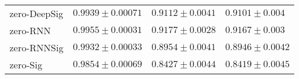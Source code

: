 \begin{tabular}{llll}
zero-DeepSig   &                           $ 0.9939 \pm 0.00071 $ &                           $ 0.9112 \pm 0.0041 $ &                            $ 0.9101 \pm 0.004 $ \\
zero-RNN       &                           $ 0.9955 \pm 0.00031 $ &                           $ 0.9177 \pm 0.0028 $ &                            $ 0.9167 \pm 0.003 $ \\
zero-RNNSig    &                           $ 0.9932 \pm 0.00033 $ &                           $ 0.8954 \pm 0.0041 $ &                           $ 0.8946 \pm 0.0042 $ \\
zero-Sig       &                           $ 0.9854 \pm 0.00069 $ &                           $ 0.8427 \pm 0.0044 $ &                           $ 0.8419 \pm 0.0045 $ \\
\bottomrule
\end{tabular}
